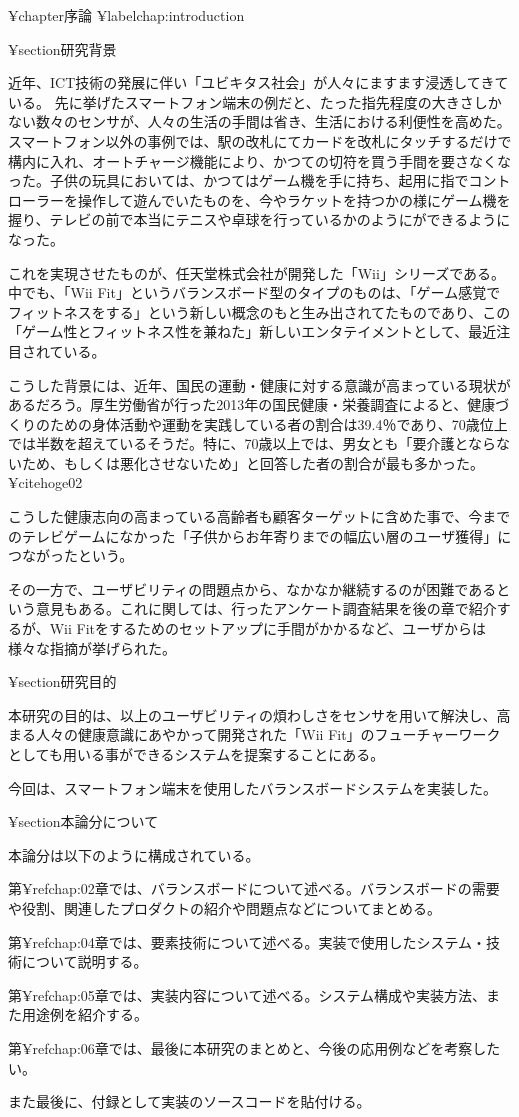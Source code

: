 ¥chapter{序論}
¥label{chap:introduction}


¥section{研究背景}

近年、ICT技術の発展に伴い「ユビキタス社会」が人々にますます浸透してきている。
先に挙げたスマートフォン端末の例だと、たった指先程度の大きさしかない数々のセンサが、人々の生活の手間は省き、生活における利便性を高めた。
スマートフォン以外の事例では、駅の改札にてカードを改札にタッチするだけで構内に入れ、オートチャージ機能により、かつての切符を買う手間を要さなくなった。子供の玩具においては、かつてはゲーム機を手に持ち、起用に指でコントローラーを操作して遊んでいたものを、今やラケットを持つかの様にゲーム機を握り、テレビの前で本当にテニスや卓球を行っているかのようにができるようになった。

これを実現させたものが、任天堂株式会社が開発した「Wii」シリーズである。中でも、「Wii Fit」というバランスボード型のタイプのものは、「ゲーム感覚でフィットネスをする」という新しい概念のもと生み出されてたものであり、この「ゲーム性とフィットネス性を兼ねた」新しいエンタテイメントとして、最近注目されている。

こうした背景には、近年、国民の運動・健康に対する意識が高まっている現状があるだろう。厚生労働省が行った2013年の国民健康・栄養調査によると、健康づくりのための身体活動や運動を実践している者の割合は39.4％であり、70歳位上では半数を超えているそうだ。特に、70歳以上では、男女とも「要介護とならないため、もしくは悪化させないため」と回答した者の割合が最も多かった。¥cite{hoge02}

こうした健康志向の高まっている高齢者も顧客ターゲットに含めた事で、今までのテレビゲームになかった「子供からお年寄りまでの幅広い層のユーザ獲得」につながったという。

その一方で、ユーザビリティの問題点から、なかなか継続するのが困難であるという意見もある。これに関しては、行ったアンケート調査結果を後の章で紹介するが、Wii Fitをするためのセットアップに手間がかかるなど、ユーザからは様々な指摘が挙げられた。




¥section{研究目的}

本研究の目的は、以上のユーザビリティの煩わしさをセンサを用いて解決し、高まる人々の健康意識にあやかって開発された「Wii Fit」のフューチャーワークとしても用いる事ができるシステムを提案することにある。

今回は、スマートフォン端末を使用したバランスボードシステムを実装した。



¥section{本論分について}

本論分は以下のように構成されている。

第¥ref{chap:02}章では、バランスボードについて述べる。バランスボードの需要や役割、関連したプロダクトの紹介や問題点などについてまとめる。


第¥ref{chap:04}章では、要素技術について述べる。実装で使用したシステム・技術について説明する。

第¥ref{chap:05}章では、実装内容について述べる。システム構成や実装方法、また用途例を紹介する。

第¥ref{chap:06}章では、最後に本研究のまとめと、今後の応用例などを考察したい。

また最後に、付録として実装のソースコードを貼付ける。
